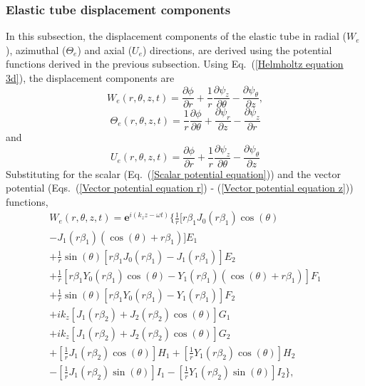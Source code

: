 \documentclass[twocolumn,10pt]{asme2ej}
\begin{document}
\subsubsection{Elastic tube displacement components}
In this subsection, the displacement components of the elastic tube in radial ($W_e$), azimuthal ($\Theta_e$) and axial ($U_e$) directions, are derived using the potential functions derived in the previous subsection. Using Eq.~(\ref{Helmholtz equation 3d}), the displacement components are
\begin{equation}
    W_{e}(r,\theta,z,t) = \frac{\partial\phi}{\partial r} + \frac{1}{r}\frac{\partial\psi_{z}}{\partial\theta} - \frac{\partial\psi_{\theta}}{\partial z},
\end{equation}
\begin{equation}
    \Theta_e(r,\theta,z,t) = \frac{1}{r}\frac{\partial\phi}{\partial\theta} + \frac{\partial\psi_r}{\partial z} - \frac{\partial\psi_z}{\partial r}
\end{equation}
and
\begin{equation}
    U_{e}(r,\theta,z,t) = \frac{\partial\phi}{\partial r} + \frac{1}{r}\frac{\partial\psi_{z}}{\partial\theta} - \frac{\partial\psi_{\theta}}{\partial z}
\end{equation}
Substituting for the scalar (Eq.~(\ref{Scalar potential equation})) and the vector potential (Eqs.~(\ref{Vector potential equation r}) - (\ref{Vector potential equation z})) functions,
\begin{multline}
    W_e(r,\theta,z,t) = \mathbf{e}^{i(k_{z}z-\omega t)}\bigg\{\frac{1}{r}[r\beta_1 J_0(r\beta_1)\cos(\theta)\\ - J_1(r\beta_1)(\cos(\theta) + r\beta_1)]E_1\\ + \frac{1}{r}\sin(\theta)[r\beta_1 J_0(r\beta_1) - J_1(r\beta_1)]E_2\\ + \frac{1}{r}[r\beta_1 Y_0(r\beta_1)\cos(\theta) - Y_1(r\beta_1)(\cos(\theta) + r\beta_1)]F_1\\ + \frac{1}{r}\sin(\theta)[r\beta_1 Y_0(r\beta_1) - Y_1(r\beta_1)]F_2\\ + ik_z[J_1(r\beta_2) + J_2(r\beta_2)\cos(\theta)]G_1\\ + ik_z[J_1(r\beta_2) + J_2(r\beta_2)\cos(\theta)]G_2\\ + [\frac{1}{r}J_1(r\beta_2)\cos(\theta)]H_1 + [\frac{1}{r}Y_1(r\beta_2)\cos(\theta)]H_2\\ - [\frac{1}{r}J_1(r\beta_2)\sin(\theta)]I_1 - [\frac{1}{r}Y_1(r\beta_2)\sin(\theta)]I_2 \bigg\},
\end{multline}
\end{document}
